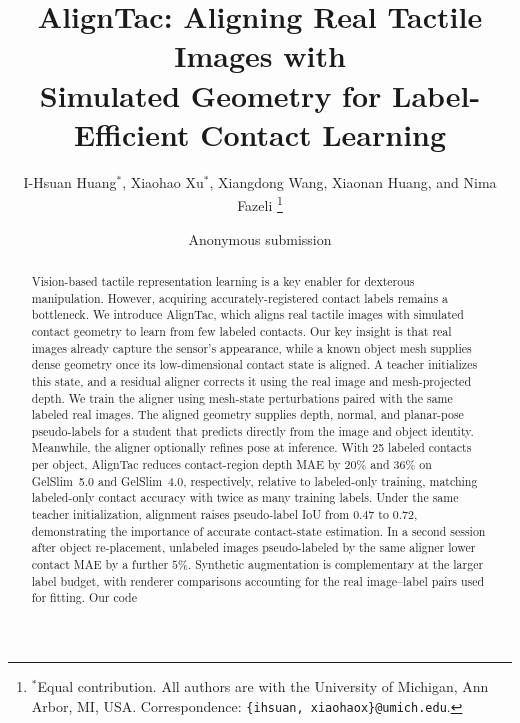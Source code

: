 \documentclass[letterpaper,10pt,conference]{ieeeconf}
\title{\LARGE\bf AlignTac: Aligning Real Tactile Images
with\\ Simulated Geometry for Label-Efficient Contact Learning}
\author{I-Hsuan Huang$^{*}$, Xiaohao Xu$^{*}$, Xiangdong Wang, Xiaonan Huang, and Nima Fazeli%
\thanks{$^{*}$Equal contribution. All authors are with the University of Michigan, Ann Arbor, MI, USA.
Correspondence: \texttt{\{ihsuan, xiaohaox\}@umich.edu}.}%
}
\author{Anonymous submission}
\begin{document}
\maketitle
\thispagestyle{empty}
\pagestyle{empty}\raggedbottom

\begin{abstract}
Vision-based tactile representation learning is a key enabler for dexterous manipulation. However, acquiring accurately-registered contact labels remains a bottleneck. We introduce AlignTac, which aligns real tactile images with simulated contact geometry to learn from few labeled contacts. Our key insight is that real images already capture the sensor's appearance, while a known object mesh supplies dense geometry once its low-dimensional contact state is aligned. A teacher initializes this state, and a residual aligner corrects it using the real image and mesh-projected depth. We train the aligner using mesh-state perturbations paired with the same labeled real images. The aligned geometry supplies depth, normal, and planar-pose pseudo-labels for a student that predicts directly from the image and object identity. Meanwhile, the aligner optionally refines pose at inference. With 25 labeled contacts per object, AlignTac reduces contact-region depth MAE by $20\%$ and $36\%$ on GelSlim~5.0 and GelSlim~4.0, respectively, relative to labeled-only training, matching labeled-only contact accuracy with twice as many training labels. Under the same teacher initialization, alignment raises pseudo-label IoU from $0.47$ to $0.72$, demonstrating the importance of accurate contact-state estimation. In a second session after object re-placement, unlabeled images pseudo-labeled by the same aligner lower contact MAE by a further $5\%$. Synthetic augmentation is complementary at the larger label budget, with renderer comparisons accounting for the real image–label pairs used for fitting. Our code 
\end{abstract}










\end{document}
